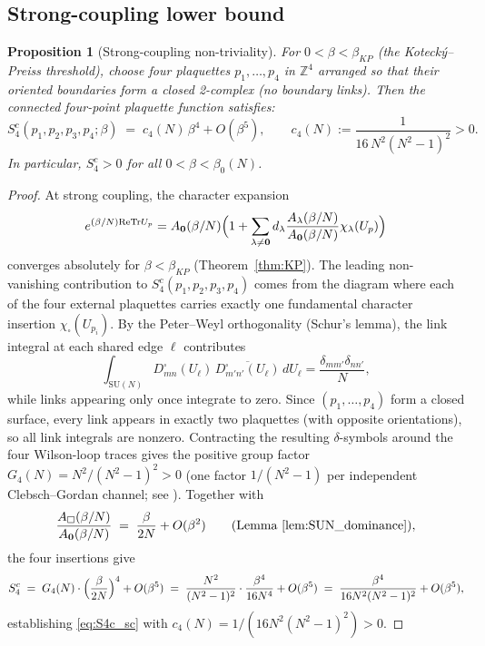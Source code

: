 \documentclass[11pt,a4paper]{amsart}
\newtheorem{proposition}[theorem]{Proposition}
\theoremstyle{definition}
\newcommand{\SU}{\mathrm{SU}}
\newcommand{\re}{\mathrm{Re}}
\newcommand{\Tr}{\mathrm{Tr}}
\begin{document}
\subsection{Strong-coupling lower bound}
\label{sec:nontrivial_strong}

\begin{proposition}[Strong-coupling non-triviality]
\label{prop:nontrivial_strong}
For $0 < \beta < \beta_{KP}$ (the Koteck\'y--Preiss threshold), choose four
plaquettes $p_1,\ldots,p_4$ in $\mathbb{Z}^4$ arranged so that their oriented
boundaries form a closed 2-complex (no boundary links).  Then the connected
four-point plaquette function satisfies:
\begin{equation}
\label{eq:S4c_sc}
  S_4^c(p_1,p_2,p_3,p_4;\beta)
  \;=\; c_4(N)\,\beta^4 + O(\beta^5),
  \qquad
  c_4(N) := \frac{1}{16\,N^2(N^2-1)^2} > 0.
\end{equation}
In particular, $S_4^c > 0$ for all $0 < \beta < \beta_0(N)$.
\end{proposition}

\begin{proof}
At strong coupling, the character expansion
\[
  e^{(\beta/N)\re\Tr U_p}
  = A_\mathbf{0}(\beta/N)\Bigl(1 + \sum_{\lambda\ne\mathbf{0}} d_\lambda \frac{A_\lambda(\beta/N)}{A_\mathbf{0}(\beta/N)}\chi_\lambda(U_p)\Bigr)
\]
converges absolutely for $\beta < \beta_{KP}$ (Theorem~\ref{thm:KP}).
The leading non-vanishing contribution to $S_4^c(p_1,p_2,p_3,p_4)$ comes from
the diagram where each of the four external plaquettes carries exactly one
fundamental character insertion $\chi_\square(U_{p_i})$.  By the Peter--Weyl
orthogonality (Schur's lemma), the link integral at each shared edge $\ell$
contributes
\[
  \int_{\SU(N)} D^\square_{mn}(U_\ell)\,\overline{D^\square_{m'n'}(U_\ell)}\,dU_\ell
  = \frac{\delta_{mm'}\delta_{nn'}}{N},
\]
while links appearing only once integrate to zero.  Since $(p_1,\ldots,p_4)$ form
a closed surface, every link appears in exactly two plaquettes (with opposite
orientations), so all link integrals are nonzero.  Contracting the resulting
$\delta$-symbols around the four Wilson-loop traces gives the positive group factor
$G_4(N) = N^2/(N^2-1)^2 > 0$ (one factor $1/(N^2-1)$ per independent
Clebsch--Gordan channel; see \cite[Ch.~9]{Makeenko}).  Together with
\[
  \frac{A_\square(\beta/N)}{A_\mathbf{0}(\beta/N)}
  \;=\; \frac{\beta}{2N} + O(\beta^2)
  \qquad\text{(Lemma~\ref{lem:SUN_dominance})},
\]
the four insertions give
\[
  S_4^c \;=\; G_4(N)\cdot\Bigl(\frac{\beta}{2N}\Bigr)^4 + O(\beta^5)
  \;=\; \frac{N^2}{(N^2-1)^2}\cdot\frac{\beta^4}{16N^4} + O(\beta^5)
  \;=\; \frac{\beta^4}{16N^2(N^2-1)^2} + O(\beta^5),
\]
establishing \eqref{eq:S4c_sc} with $c_4(N) = 1/(16N^2(N^2-1)^2) > 0$.
\end{proof}
\end{document}
